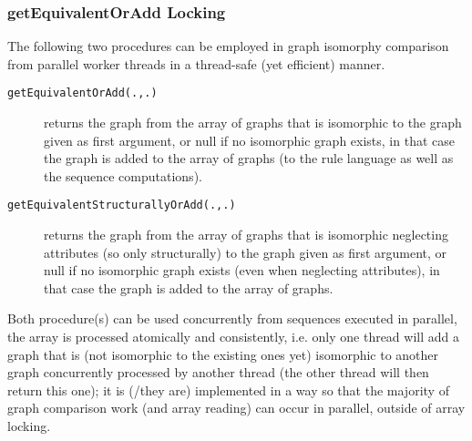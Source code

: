 \subsubsection*{getEquivalentOrAdd Locking}

The following two procedures can be employed in graph isomorphy comparison from parallel worker threads in a thread-safe (yet efficient) manner.

\begin{description}
\item[\texttt{getEquivalentOrAdd(.,.)}] returns the graph from the array of graphs 
  that is isomorphic to the graph given as first argument, or null if no isomorphic graph exists,
  in that case the graph is added to the array of graphs (to the rule language as well as the sequence computations).
\item[\texttt{getEquivalentStructurallyOrAdd(.,.)}] returns the graph from the array of graphs
  that is isomorphic neglecting attributes (so only structurally) to the graph given as first argument,
  or null if no isomorphic graph exists (even when neglecting attributes), in that case the graph is added to the array of graphs.
\end{description}
 
Both procedure(s) can be used concurrently from sequences executed in parallel,
the array is processed atomically and consistently, i.e. only one thread will add a graph
that is (not isomorphic to the existing ones yet) isomorphic to another graph concurrently processed by another thread (the other thread will then return this one);
it is (/they are) implemented in a way so that the majority of graph comparison work (and array reading) can occur in parallel, outside of array locking.

